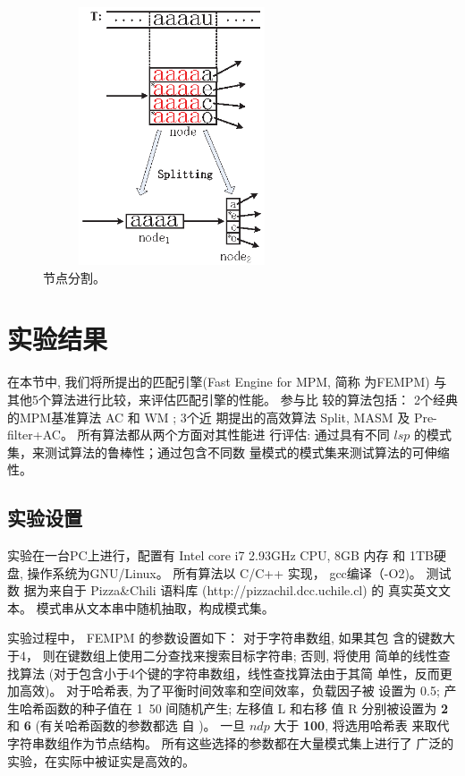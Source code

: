 \begin{figure}[H]
  \centering
  \includegraphics[height=3in, width=3in]{figures/2_MPM/node_split}
  \caption{节点分割。}
  \label{fig:split}
\end{figure}

\section{实验结果}
\label{sec:experiments}

在本节中, 我们将所提出的匹配引擎(Fast Engine for MPM, 简称
为\textsf{FEMPM}) 与其他5个算法进行比较，来评估匹配引擎的性能。 参与比
较的算法包括： 2个经典的MPM基准算法 \textsf{AC} 和 \textsf{WM} ; 3个近
期提出的高效算法 \textsf{Split},
\textsf{MASM} 及 \textsf{Pre-filter+AC}。 所有算法都从两个方面对其性能进
行评估: 通过具有不同 $lsp$ 的模式集，来测试算法的鲁棒性；通过包含不同数
量模式的模式集来测试算法的可伸缩性。

\subsection{实验设置}


实验在一台PC上进行，配置有 Intel core i7 2.93GHz CPU, 8GB 内存 和 1TB硬
盘, 操作系统为GNU/Linux。 所有算法以 C/C++ 实现， gcc编译（-O2)。 测试数
据为来自于 Pizza\;\&\;Chili 语料库 (http://pizzachil.dcc.uchile.cl) 的
真实英文文本。 模式串从文本串中随机抽取，构成模式集。

实验过程中， \textsf{FEMPM} 的参数设置如下： 对于字符串数组, 如果其包
含的键数大于4， 则在键数组上使用二分查找来搜索目标字符串; 否则, 将使用
简单的线性查找算法 (对于包含小于4个键的字符串数组，线性查找算法由于其简
单性，反而更加高效)。 对于哈希表, 为了平衡时间效率和空间效率，负载因子被
设置为 {0.5}; 产生哈希函数的种子值在 1~50 间随机产生; 左移值 L 和右移
值 R 分别被设置为 \textbf{2} 和 \textbf{6} (有关哈希函数的参数都选
自 \cite{Ramakrishna1997})。 一旦 $ndp$ 大于 \textbf{100}, 将选用哈希表
来取代字符串数组作为节点结构。 所有这些选择的参数都在大量模式集上进行了
广泛的实验，在实际中被证实是高效的。

